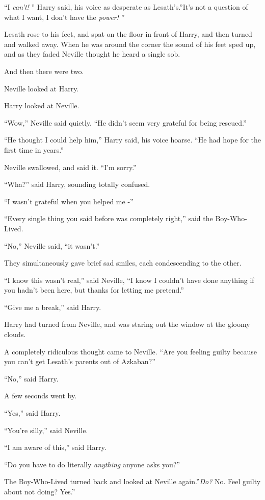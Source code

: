 ``I \emph{can't!} '' Harry said, his voice as desperate as Lesath's.''It's
not a question of what I want, I don't have the \emph{power!} ''

Lesath rose to his feet, and spat on the floor in front of Harry, and
then turned and walked away. When he was around the corner the sound of
his feet sped up, and as they faded Neville thought he heard a single
sob.

And then there were two.

Neville looked at Harry.

Harry looked at Neville.

``Wow,'' Neville said quietly. ``He didn't seem very grateful for being
rescued.''

``He thought I could help him,'' Harry said, his voice hoarse. ``He had
hope for the first time in years.''

Neville swallowed, and said it. ``I'm sorry.''

``Wha?'' said Harry, sounding totally confused.

``I wasn't grateful when you helped me -''

``Every single thing you said before was completely right,'' said the
Boy-Who-Lived.

``No,'' Neville said, ``it wasn't.''

They simultaneously gave brief sad smiles, each condescending to the
other.

``I know this wasn't real,'' said Neville, ``I know I couldn't have done
anything if you hadn't been here, but thanks for letting me pretend.''

``Give me a break,'' said Harry.

Harry had turned from Neville, and was staring out the window at the
gloomy clouds.

A completely ridiculous thought came to Neville. ``Are you feeling
guilty because you can't get Lesath's parents out of Azkaban?''

``No,'' said Harry.

A few seconds went by.

``Yes,'' said Harry.

``You're silly,'' said Neville.

``I am aware of this,'' said Harry.

``Do you have to do literally \emph{anything} anyone asks you?''

The Boy-Who-Lived turned back and looked at Neville again.''\emph{Do?}
No. Feel guilty about not doing? Yes.''

